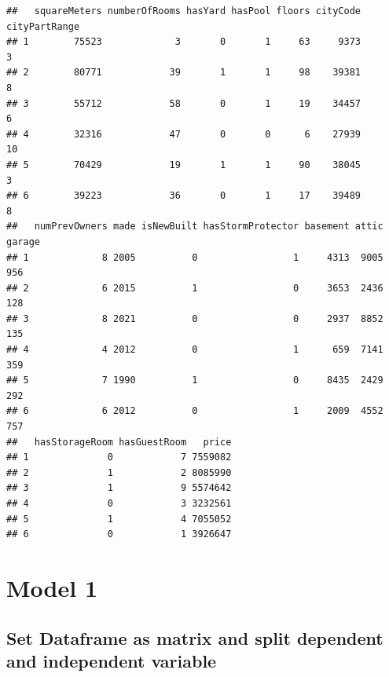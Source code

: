 \documentclass[
]{article}
\begin{document}
\begin{verbatim}
##   squareMeters numberOfRooms hasYard hasPool floors cityCode cityPartRange
## 1        75523             3       0       1     63     9373             3
## 2        80771            39       1       1     98    39381             8
## 3        55712            58       0       1     19    34457             6
## 4        32316            47       0       0      6    27939            10
## 5        70429            19       1       1     90    38045             3
## 6        39223            36       0       1     17    39489             8
##   numPrevOwners made isNewBuilt hasStormProtector basement attic garage
## 1             8 2005          0                 1     4313  9005    956
## 2             6 2015          1                 0     3653  2436    128
## 3             8 2021          0                 0     2937  8852    135
## 4             4 2012          0                 1      659  7141    359
## 5             7 1990          1                 0     8435  2429    292
## 6             6 2012          0                 1     2009  4552    757
##   hasStorageRoom hasGuestRoom   price
## 1              0            7 7559082
## 2              1            2 8085990
## 3              1            9 5574642
## 4              0            3 3232561
## 5              1            4 7055052
## 6              0            1 3926647
\end{verbatim}

\section{Model 1}\label{model-1}

\subsection{Set Dataframe as matrix and split dependent and independent
variable}\label{set-dataframe-as-matrix-and-split-dependent-and-independent-variable}
\end{document}
